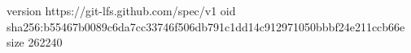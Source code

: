 version https://git-lfs.github.com/spec/v1
oid sha256:b55467b0089c6da7cc33746f506db791c1dd14c912971050bbbf24e211ccb66e
size 262240
